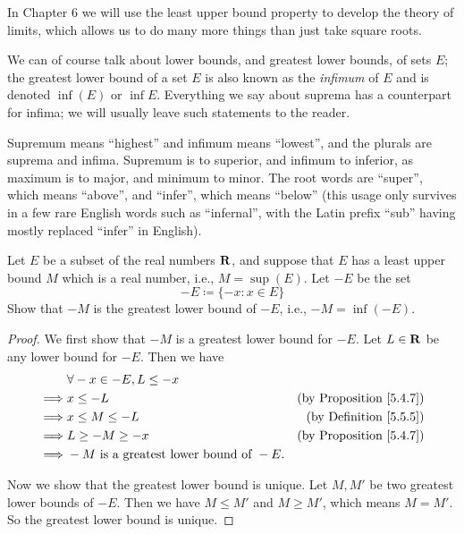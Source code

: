 \begin{remark}\label{5.5.14}
    In Chapter 6 we will use the least upper bound property to develop the theory of limits, which allows us to do many more things than just take square roots.
\end{remark}

\begin{remark}\label{5.5.15}
    We can of course talk about lower bounds, and greatest lower bounds, of sets \(E\);
    the greatest lower bound of a set \(E\) is also known as the \emph{infimum} of \(E\) and is denoted \(\inf(E)\) or \(\inf E\).
    Everything we say about suprema has a counterpart for infima;
    we will usually leave such statements to the reader.
\end{remark}

\begin{note}
    Supremum means ``highest'' and infimum means ``lowest'', and the plurals are suprema and infima.
    Supremum is to superior, and infimum to inferior, as maximum is to major, and minimum to minor.
    The root words are ``super'', which means ``above'', and ``infer'', which means ``below''
    (this usage only survives in a few rare English words such as ``infernal'', with the Latin prefix ``sub'' having mostly replaced ``infer'' in English).
\end{note}

\exercisesection

\begin{exercise}\label{ex 5.5.1}
    Let \(E\) be a subset of the real numbers \(\mathbf{R}\), and suppose that \(E\) has a least upper bound \(M\) which is a real number, i.e., \(M = \sup(E)\).
    Let \(-E\) be the set
    \[
        -E \coloneqq \{-x : x \in E\}
    \]
    Show that \(-M\) is the greatest lower bound of \(-E\), i.e., \(-M = \inf(-E)\).
\end{exercise}

\begin{proof}
    We first show that \(-M\) is a greatest lower bound for \(-E\).
    Let \(L \in \mathbf{R}\) be any lower bound for \(-E\).
    Then we have
    \begin{align*}
                 & \forall -x \in -E, L \leq -x                                                       \\
        \implies & x \leq -L                                    & \text{(by Proposition \ref{5.4.7})} \\
        \implies & x \leq M \leq -L                             & \text{(by Definition \ref{5.5.5})}  \\
        \implies & L \geq -M \geq -x                            & \text{(by Proposition \ref{5.4.7})} \\
        \implies & -M \text{ is a greatest lower bound of } -E.
    \end{align*}

    Now we show that the greatest lower bound is unique.
    Let \(M, M'\) be two greatest lower bounds of \(-E\).
    Then we have \(M \leq M'\) and \(M \geq M'\), which means \(M = M'\).
    So the greatest lower bound is unique.
\end{proof}

